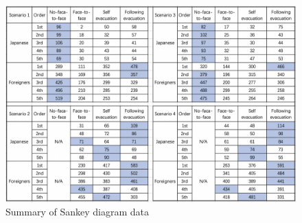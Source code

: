 \begin{figure}[h]
  \includegraphics[width=\linewidth]{Figure/Figure28.jpg}
  \centering
  \caption{Summary of Sankey diagram data}
  \label{fig28}
\end{figure}
\fi







